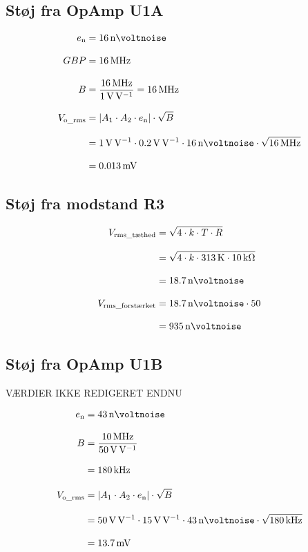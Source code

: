 \documentclass[a4paper, 11pt, article,oneside,openany]{memoir} %
\newcommand{\tsub}[1]{_{\textup{#1}}}
\begin{document}
\subsection{Støj fra OpAmp U1A}


\begin{align*}
e\tsub{n} &= \SI{16}{\nano\voltnoise}
\\[2.0ex]
GBP &= \SI{16}{\mega\hertz}
\\[2.0ex]
B &= \frac{ \SI{16}{\mega\hertz}}{\SI{1}{\volt\per\volt}} = \SI{16}{\mega\hertz}
\\[2.0ex]
V\tsub{o\_rms} &= \left| A_1\cdot A_2 \cdot e\tsub{n} \right| \cdot \sqrt{B}
\\[2.0ex]
&= \SI{1}{\volt\per\volt} \cdot \SI{0.2}{\volt\per\volt} \cdot \SI{16}{\nano\voltnoise} \cdot \sqrt{\SI{16}{\mega\hertz}}
\\[2.0ex]
&= \SI{0.013}{\milli\volt}
\end{align*}


\subsection{Støj fra modstand R3}



\begin{align*}
V\tsub{rms\_tæthed} &= \sqrt{4 \cdot k \cdot T \cdot R}
\\[2.0ex]
&= \sqrt{4 \cdot k\cdot \SI{313}{\kelvin} \cdot \SI{10}{\kilo\ohm}}
\\[2.0ex]
&= \SI{18.7}{\nano\voltnoise}
\\[2.0ex]
V\tsub{rms\_forstærket} &= \SI{18.7}{\nano\voltnoise} \cdot 50
\\[2.0ex]
&= \SI{935}{\nano\voltnoise}
\end{align*}


\subsection{Støj fra OpAmp U1B}



VÆRDIER IKKE REDIGERET ENDNU

\begin{align*}
e\tsub{n} &= \SI{43}{\nano\voltnoise}
\\[2.0ex]
B &= \frac{ \SI{10}{\mega\hertz}}{\SI{50}{\volt\per\volt}}
\\[2.0ex]
&= \SI{180}{\kilo\hertz}
\\[2.0ex]
V\tsub{o\_rms} &= \left| A_1\cdot A_2 \cdot e\tsub{n} \right| \cdot \sqrt{B}
\\[2.0ex]
&= \SI{50}{\volt\per\volt} \cdot \SI{15}{\volt\per\volt} \cdot \SI{43}{\nano\voltnoise} \cdot \sqrt{\SI{180}{\kilo\hertz}}
\\[2.0ex]
&= \SI{13.7}{\milli\volt}
\end{align*}
\end{document}
